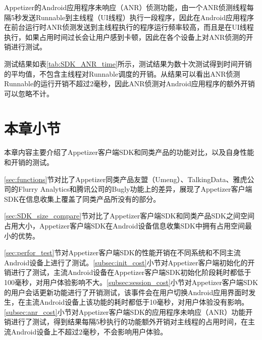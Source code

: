 Appetizer的Android应用程序未响应（ANR）侦测功能，由一个ANR侦测线程每隔5秒发送Runnable到主线程（UI线程）执行一段程序，因此在Android应用程序在前台运行时ANR侦测发送到主线程执行的程序运行频率较高，而且是在UI线程执行，如果占用时间过长会让用户感到卡顿，因此在各个设备上对ANR侦测的开销进行测试。

测试结果如表\ref{tab:SDK_ANR_time}所示，测试结果为数十次测试得到时间开销的平均值，不包含主线程对Runnable调度的开销。从结果可以看出ANR侦测Runnable的运行开销不超过2毫秒，因此ANR侦测对Android应用程序的额外开销可以忽略不计。

\section{本章小节}

本章内容主要介绍了Appetizer客户端SDK和同类产品的功能对比，以及自身性能和开销的测试。

\ref{sec:functions}节对比了Appetizer同类产品友盟（Umeng）、TalkingData、雅虎公司的Flurry Analytics和腾讯公司的Bugly功能上的差异，展现了Appetizer客户端SDK在信息收集上覆盖了同类产品所没有的部分。

\ref{sec:SDK_size_compare}节对比了Appetizer客户端SDK和同类产品SDK之间空间占用大小，Appetizer客户端SDK在Android设备信息收集SDK中拥有占用空间最小的优势。

\ref{sec:perfor_test}节对Appetizer客户端SDK的性能开销在不同系统和不同主流Android设备上进行了测试。\ref{subsec:init_cost}小节对Appetizer客户端初始化的开销进行了测试，主流Android设备在Appetizer客户端SDK初始化阶段耗时都低于100毫秒，对用户体验影响不大。\ref{subsec:session_cost}小节对Appetizer客户端SDK的用户会话更新功能进行了开销测试，该事件会在用户切换Android应用界面时发生，在主流Android设备上该功能的耗时都低于10毫秒，对用户体验没有影响。\ref{subsec:anr_cost}小节对Appetizer客户端SDK的应用程序未响应（ANR）功能开销进行了测试，得到结果每隔5秒执行的功能额外开销对主线程的占用时间，在主流Android设备上不超过2毫秒，不会影响用户体验。
